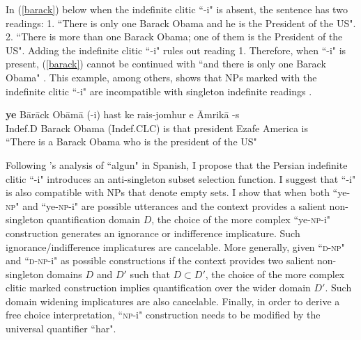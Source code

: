 \documentclass [11pt] {article}
\begin{document}
In (\ref{barack}) below when the indefinite clitic ``-i" is absent, the sentence has two readings: 1. ``There is only one Barack Obama and he is the President of the US". 2. ``There is more than one Barack Obama; one of them is the President of the US". Adding the indefinite clitic ``-i" rules out reading 1. Therefore, when ``-i" is present, (\ref{barack}) cannot be continued with ``and there is only one Barack Obama" . This example, among others, shows that NPs marked with the indefinite clitic ``-i" are incompatible with singleton indefinite readings \citep{schwarzschild2002singleton}.

	\begin {exe}
		\ex \label {barack}
		\gll	\textbf{ye}	B\={a}r\={a}ck Ob\={a}m\={a}	(-i)	hast	ke		rais-jomhur	e \={A}mrik\={a} -s\\
			{\scriptsize Indef.D} Barack Obama	({\scriptsize Indef.CLC})	is		that	president	{\scriptsize Ezafe} America is\\
				``There is a Barack Obama who is the president of the US"
	\end {exe}

Following \cite{alonso2008minimal, alonso2010modal}'s analysis of ``algun" in Spanish, I propose that the Persian indefinite clitic ``-i" introduces an anti-singleton subset selection function. I suggest that ``-i" is also compatible with NPs that denote empty sets. I show that when both ``ye-\textsc{np}" and ``ye-\textsc{np}-i" are possible utterances and the context provides a salient non-singleton quantification domain $D$, the choice of the more complex ``ye-\textsc{np}-i" construction generates an ignorance or indifference implicature. Such ignorance/indifference implicatures are cancelable. More generally, given ``\textsc{d}-\textsc{np}" and ``\textsc{d}-\textsc{np}-i" as possible constructions if the context provides two salient non-singleton domains $D$ and $D'$ such that $D\subset D'$, the choice of the more complex clitic marked construction implies quantification over the wider domain $D'$. Such domain widening implicatures are also cancelable. Finally, in order to derive a free choice interpretation, ``\textsc{np}-i" construction needs to be modified by the universal quantifier ``har".


\newpage
\thispagestyle{empty}



\end{document}
